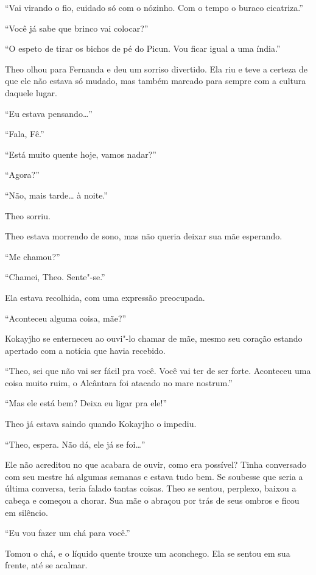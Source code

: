 ``Vai virando o fio, cuidado só com o nózinho. Com o tempo o buraco
cicatriza.''

``Você já sabe que brinco vai colocar?''

``O espeto de tirar os bichos de pé do Picun. Vou ficar igual a uma
índia.''

Theo olhou para Fernanda e deu um sorriso divertido. Ela riu e teve a
certeza de que ele não estava só mudado, mas também marcado para sempre
com a cultura daquele lugar.

``Eu estava pensando\ldots{}''

``Fala, Fê.''

``Está muito quente hoje, vamos nadar?''

``Agora?''

``Não, mais tarde\ldots{} à noite.''

Theo sorriu.

\asterisc


Theo estava morrendo de sono, mas não queria deixar sua mãe esperando.

``Me chamou?''

``Chamei, Theo. Sente"-se.''

Ela estava recolhida, com uma expressão preocupada.

``Aconteceu alguma coisa, mãe?''

Kokayjho se enterneceu ao ouvi"-lo chamar de mãe, mesmo seu
coração estando apertado com a notícia que havia recebido.

``Theo, sei que não vai ser fácil pra você. Você vai ter de ser forte.
Aconteceu uma coisa muito ruim, o Alcântara foi atacado no mare
nostrum.''

``Mas ele está bem? Deixa eu ligar pra ele!''

Theo já estava saindo quando Kokayjho o impediu.

``Theo, espera. Não dá, ele já se foi\ldots{}''

Ele não acreditou no que acabara de ouvir, como era possível? Tinha
conversado com seu mestre há algumas semanas e estava tudo bem. Se
soubesse que seria a última conversa, teria falado tantas coisas.
Theo se sentou, perplexo, baixou a cabeça e começou a chorar. Sua mãe o
abraçou por trás de seus ombros e ficou em silêncio.

``Eu vou fazer um chá para você.''

Tomou o chá, e o líquido quente trouxe um aconchego. Ela se sentou
em sua frente, até se acalmar.

